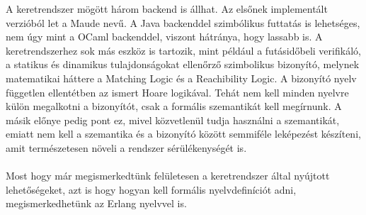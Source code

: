 A keretrendszer mögött három backend is állhat. Az elsőnek implementált verzióból let a Maude nevű. A Java backenddel szimbólikus futtatás is lehetséges, nem úgy mint a OCaml backenddel, viszont hátránya, hogy lassabb is. A keretrendszerhez sok más eszköz is tartozik, mint például a futásidőbeli verifikáló, a statikus és dinamikus tulajdonságokat ellenőrző szimbolikus bizonyító, melynek matematikai háttere a Matching Logic és a Reachibility Logic. A bizonyító nyelv független ellentétben az ismert Hoare logikával. Tehát nem kell minden nyelvre külön megalkotni a bizonyítót, csak a formális szemantikát kell megírnunk. A másik előnye pedig pont ez, mivel közvetlenül tudja használni a szemantikát, emiatt nem kell a szemantika és a bizonyító között semmiféle leképezést készíteni, amit természetesen növeli a rendszer sérülékenységét is.

\paragraph{}
Most hogy már megismerkedtünk felületesen a keretrendszer által nyújtott lehetőségeket, azt is hogy hogyan kell formális nyelvdefiníciót adni, megismerkedhetünk az Erlang nyelvvel is.